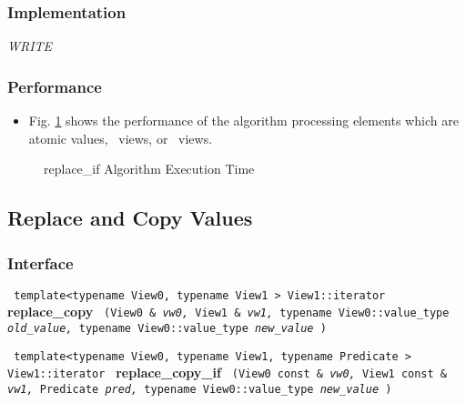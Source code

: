 \subsubsection{Implementation} %

\textit{WRITE}

\subsubsection{Performance} %

\begin{itemize}
\item
Fig. \ref{fig:repl-if-alg-exec-exper}
shows the performance of the algorithm processing
elements which are atomic values, \stl\ views, or \stapl\ views.
\end{itemize}

\begin{figure}[p]
\caption{replace\_if Algorithm Execution Time}
\label{fig:repl-if-alg-exec-exper}
\end{figure}


\subsection{Replace and Copy Values} \label{sec-muta-repl_copy}

\subsubsection{Interface} %

\noindent
\texttt{%
template<typename View0, typename View1 >
\newline
View1::iterator 
}
\newline
\textbf{replace\_copy}%
\texttt{%
(View0 \&
\textit{vw0,}%
View1 \&
\textit{vw1,}%
typename View0::value\_type 
\textit{old\_value,}%
typename View0::value\_type 
\textit{new\_value}%
)
}
\vspace{0.4cm}

\noindent
\texttt{%
template<typename View0, typename View1, typename Predicate >
\newline
View1::iterator 
}
\newline
\textbf{replace\_copy\_if}%
\texttt{%
(View0 const \&
\textit{vw0,}%
View1 const \&
\textit{vw1,}%
Predicate 
\textit{pred,}%
typename View0::value\_type 
\textit{new\_value}%
)
}

